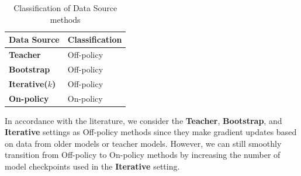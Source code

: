 \documentclass[12pt]{cmuthesis}
\newcommand{\todo}[1]{\textcolor{red}{TODO: #1}}
\begin{document}
\begin{table}[h]
  \centering
  \begin{tabular}{|l|l|}
    \toprule
    \textbf{Data Source} & \textbf{Classification} \\
    \midrule
    \textbf{Teacher} & Off-policy \\
    \textbf{Bootstrap} & Off-policy \\
    \textbf{Iterative($k$)} & Off-policy \\
    \textbf{On-policy} & On-policy \\
    \bottomrule
  \end{tabular}
  \vspace{0.5em}
  \caption{Classification of Data Source methods}
  \label{tab:data-source-classification}
\end{table}

In accordance with the literature, we consider the \textbf{Teacher}, \textbf{Bootstrap}, and \textbf{Iterative} settings as Off-policy methods since they make gradient updates based on data from older models or teacher models. However, we can still smoothly transition from Off-policy to On-policy methods by increasing the number of model checkpoints used in the \textbf{Iterative} setting.



\end{document}
